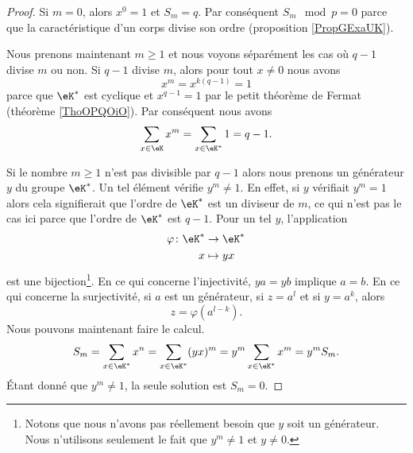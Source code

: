 \begin{proof}
    Si \( m=0\), alors \( x^0=1\) et \( S_m=q\). Par conséquent \( S_m\mod p=0\) parce que la caractéristique d'un corps divise son ordre (proposition \ref{PropGExaUK}). 

    Nous prenons maintenant \( m\geq 1\) et nous voyons séparément les cas où \( q-1\) divise \( m\) ou non. Si \( q-1\) divise \( m\), alors pour tout \( x\neq 0\) nous avons
    \begin{equation}
        x^m=x^{k(q-1)}=1
    \end{equation}
    parce que \( \eK^*\) est cyclique et \( x^{q-1}=1\) par le petit théorème de Fermat (théorème \ref{ThoOPQOiO}). Par conséquent nous avons
    \begin{equation}
        \sum_{x\in \eK}x^m=\sum_{x\in \eK^*}1=q-1.
    \end{equation}
    
    Si le nombre \( m\geq 1\) n'est pas divisible par \( q-1\) alors nous prenons un générateur \( y\) du groupe \( \eK^*\). Un tel élément vérifie \( y^m\neq 1\). En effet, si \( y\) vérifiait \( y^m=1\) alors cela signifierait que l'ordre de \( \eK^*\) est un diviseur de \( m\), ce qui n'est pas le cas ici parce que l'ordre de \( \eK^*\) est \( q-1\). Pour un tel \( y\), l'application
    \begin{equation}
        \begin{aligned}
            \varphi\colon \eK^*&\to \eK^* \\
            x&\mapsto yx 
        \end{aligned}
    \end{equation}
    est une bijection\footnote{Notons que nous n'avons pas réellement besoin que \( y\) soit un générateur. Nous n'utilisons seulement le fait que \( y^m\neq 1\) et \( y\neq 0\).}. En ce qui concerne l'injectivité, \( ya=yb\) implique \( a=b\). En ce qui concerne la surjectivité, si \( a\) est un générateur, si \( z=a^l\) et si \( y=a^k\), alors
    \begin{equation}
        z=\varphi(a^{l-k}).
    \end{equation}
    Nous pouvons maintenant faire le calcul.
    \begin{equation}
        S_m=\sum_{x\in \eK^*}x^n=\sum_{x\in \eK^*}(yx)^m=y^m\sum_{x\in \eK^*}x^m=y^mS_m.
    \end{equation}
    Étant donné que \( y^m\neq 1\), la seule solution est \( S_m=0\).
\end{proof}

